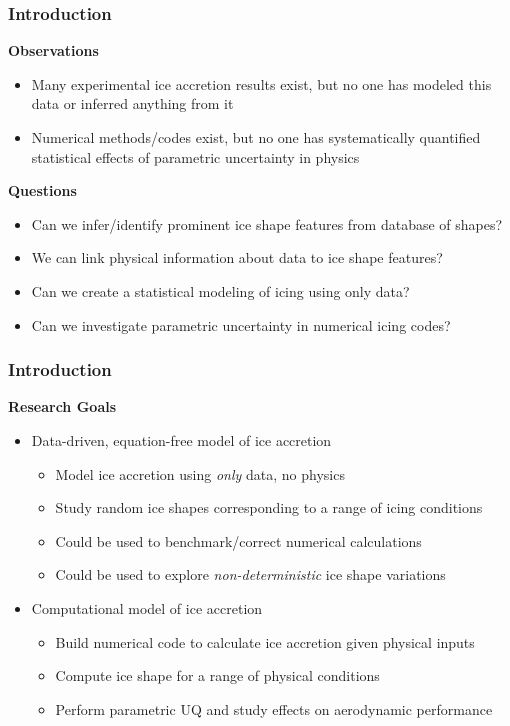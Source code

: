 \documentclass[9pt]{beamer}
\begin{document}
\begin{frame}
\frametitle{Introduction}
\label{sec-1-4}

\textbf{Observations}
\begin{itemize}
\item Many experimental ice accretion results exist, but no one has
  modeled this data or inferred anything from it
\item Numerical methods/codes exist, but no one has systematically quantified
  statistical effects of parametric uncertainty in physics
\end{itemize}
\textbf{Questions}
\begin{itemize}
\item Can we infer/identify prominent ice shape features from database of shapes?
\item We can link physical information about data to ice shape features?
\item Can we create a statistical modeling of icing using only data?
\item Can we investigate parametric uncertainty in numerical icing codes?
\end{itemize}
\end{frame}
\begin{frame}
\frametitle{Introduction}
\label{sec-1-5}

\textbf{Research Goals}

\begin{itemize}
\item Data-driven, equation-free model of ice accretion
\begin{itemize}
\item Model ice accretion using \emph{only} data, no physics
\item Study random ice shapes corresponding to a range of icing conditions
\item Could be used to benchmark/correct numerical calculations
\item Could be used to explore \emph{non-deterministic} ice shape variations
\end{itemize}
\item Computational model of ice accretion
\begin{itemize}
\item Build numerical code to calculate ice accretion given physical inputs
\item Compute ice shape for a range of physical conditions
\item Perform parametric UQ and study effects on aerodynamic performance
\end{itemize}
\end{itemize}
\end{frame}
\end{document}
